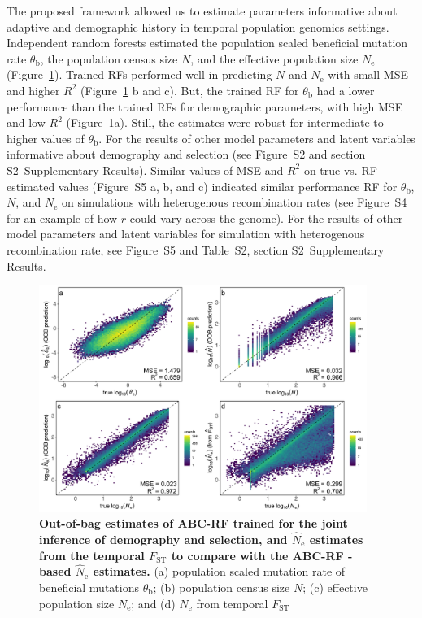 \documentclass[a4paper, 12pt]{article}
\begin{document}
The proposed framework allowed us to estimate parameters informative about adaptive and demographic history in temporal population genomics settings. Independent random forests estimated the population scaled beneficial mutation rate $\theta_\mathrm{b}$, the population census size $N$, and the effective population size $N_{\mathrm{e}}$ (Figure~\ref{fig:oob_jointDemoSel}). Trained RFs performed well in predicting $N$ and $N_{\mathrm{e}}$ with small MSE and higher $R^2$ (Figure~\ref{fig:oob_jointDemoSel} b and c). But, the trained RF for $\theta_\mathrm{b}$ had a lower performance than the trained RFs for demographic parameters, with high MSE and low $R^2$ (Figure~\ref{fig:oob_jointDemoSel}a). Still, the estimates were robust for intermediate to higher values of $\theta_\mathrm{b}$. For the results of other model parameters and latent variables informative about demography and selection (see Figure~S2 and section S2~Supplementary Results). Similar values of MSE and $R^2$ on true vs. RF estimated values (Figure~S5 a, b, and c) indicated similar performance RF for $\theta_\mathrm{b}$, $N$, and $N_{\mathrm{e}}$ on simulations with heterogenous recombination rates (see Figure~S4 for an example of how $r$ could vary across the genome). For the results of other model parameters and latent variables for simulation with heterogenous recombination rate, see Figure~S5 and Table~S2, section S2~Supplementary Results.

\begin{figure}[ht]
 \centering
 \includegraphics[width=0.95\textwidth]{Figures/Figure2_join_demo_sel.pdf}
 \small\caption{\textbf{Out-of-bag estimates of ABC-RF trained for the joint inference of demography and selection, and $\hat N_{\mathrm{e}}$ estimates from the temporal $F_{\mathrm{ST}}$ to compare with the ABC-RF -based $\hat N_{\mathrm{e}}$ estimates.}
 (a) population scaled mutation rate of beneficial mutations $\theta_\mathrm{b}$; (b) population census size $N$; (c) effective population size $N_{\mathrm{e}}$; and (d) $N_{\mathrm{e}}$ from temporal $F_{\mathrm{ST}}$}
 \label{fig:oob_jointDemoSel}
\end{figure}
\end{document}
